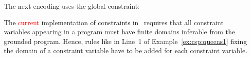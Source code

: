 \begin{example}
The next encoding uses the global  constraint:
%
%

\end{example}

\begin{note}
The \textcolor{red}{current} implementation of constraints in \gringo\ requires 
that all constraint variables appearing in a program must have finite domains inferable from the grounded program.
Hence, rules like in Line~1 of Example~\ref{ex:csp:queens1} fixing the domain of a constraint variable have to be added for each constraint variable.
\end{note}

